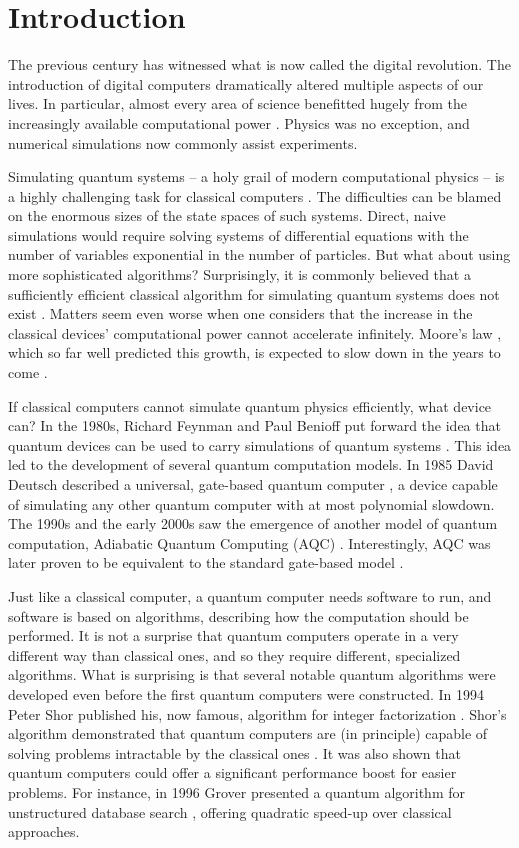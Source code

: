 \chapter{Introduction}
The previous century has witnessed what is now called the digital revolution.
The introduction of digital computers dramatically altered multiple aspects of
our lives. In particular, almost every area of science benefitted hugely from
the increasingly available computational power \cite{winsberg}. Physics was no
exception, and numerical simulations now commonly assist experiments.

Simulating quantum systems -- a holy grail of modern computational physics --
is a highly challenging task for classical computers \cite{feynman.82}. The
difficulties can be blamed on the enormous sizes of the state spaces of such
systems. Direct, naive simulations would require solving systems of
differential equations with the number of variables exponential in the number
of particles. But what about using more sophisticated algorithms? Surprisingly,
it is commonly believed that a sufficiently efficient classical algorithm for
simulating quantum systems does not exist \cite{feynman.82, poplavskii}.
Matters seem even worse when one considers that the increase in the classical
devices' computational power cannot accelerate infinitely. Moore's law
\cite{mack}, which so far well predicted this growth, is expected to slow down
in the years to come \cite{waldrop, kumar}.

If classical computers cannot simulate quantum physics efficiently, what device
can? In the 1980s, Richard Feynman and Paul Benioff put forward the idea that
quantum devices can be used to carry simulations of quantum systems
\cite{feynman.82,benioff.80}. This idea led to the development of several
quantum computation models. In 1985 David Deutsch described a universal,
gate-based quantum computer \cite{deutsch}, a device capable of simulating any
other quantum computer with at most polynomial slowdown. The 1990s and the
early 2000s saw the emergence of another model of quantum computation,
Adiabatic Quantum Computing (AQC) \cite{kadowaki,farhi}. Interestingly, AQC was
later proven to be equivalent to the standard gate-based model \cite{aharonov}.

Just like a classical computer, a quantum computer needs software to run, and
software is based on algorithms, describing how the computation should be
performed. It is not a surprise that quantum computers operate in a very
different way than classical ones, and so they require different, specialized
algorithms. What is surprising is that several notable quantum algorithms were
developed even before the first quantum computers were constructed. In 1994
Peter Shor published his, now famous, algorithm for integer factorization
\cite{shor}. Shor's algorithm demonstrated that quantum computers are (in
principle) capable of solving problems intractable by the classical ones
\cite{kleinjung}. It was also shown that quantum computers could offer a
significant performance boost for easier problems. For instance, in 1996 Grover
presented a quantum algorithm for unstructured database search \cite{grover},
offering quadratic speed-up over classical approaches.

